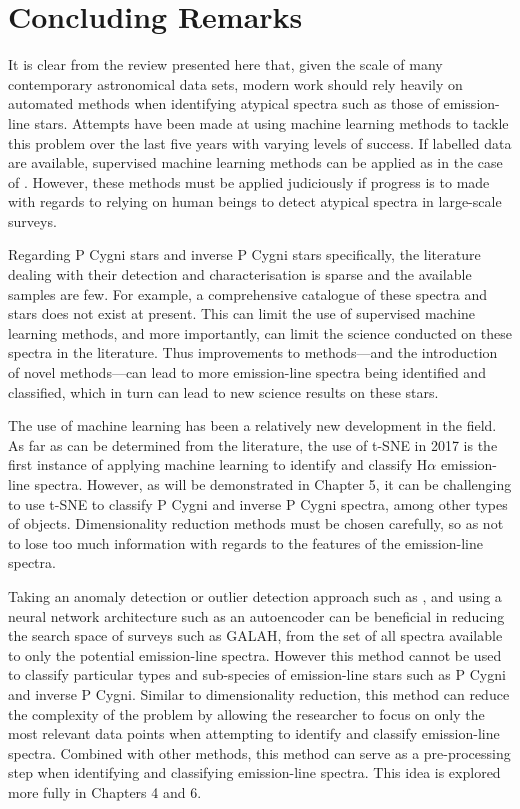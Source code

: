 \section{Concluding Remarks}

It is clear from the review presented here that, given the scale of many contemporary astronomical data sets, modern work should rely heavily on automated methods when identifying atypical spectra such as those of emission-line stars. Attempts have been made at using machine learning methods to tackle this problem over the last five years with varying levels of success. If labelled data are available, supervised machine learning methods can be applied as in the case of \citet{zhang2021catalog}. However, these methods must be applied judiciously if progress is to made with regards to relying on human beings to detect atypical spectra in large-scale surveys.

Regarding P Cygni stars and inverse P Cygni stars specifically, the literature dealing with their detection and characterisation is sparse and the available samples are few. For example, a comprehensive catalogue of these spectra and stars does not exist at present. This can limit the use of supervised machine learning methods, and more importantly, can limit the science conducted on these spectra in the literature. Thus improvements to methods—and the introduction of novel methods—can lead to more emission-line spectra being identified and classified, which in turn can lead to new science results on these stars. 

The use of machine learning has been a relatively new development in the field. As far as can be determined from the literature, the use of t-SNE in 2017 is the first instance of applying machine learning to identify and classify H$\alpha$ emission-line spectra. However, as will be demonstrated in Chapter 5, it can be challenging to use t-SNE to classify P Cygni and inverse P Cygni spectra, among other types of objects. Dimensionality reduction methods must be chosen carefully, so as not to lose too much information with regards to the features of the emission-line spectra.

Taking an anomaly detection or outlier detection approach such as \citet{vcotar2021galah}, and using a neural network architecture such as an autoencoder can be beneficial in reducing the search space of surveys such as GALAH, from the set of all spectra available to only the potential emission-line spectra. However this method cannot be used to classify particular types and sub-species of emission-line stars such as P Cygni and inverse P Cygni. Similar to dimensionality reduction, this method can reduce the complexity of the problem by allowing the researcher to focus on only the most relevant data points when attempting to identify and classify emission-line spectra. Combined with other methods, this method can serve as a pre-processing step when identifying and classifying emission-line spectra. This idea is explored more fully in Chapters 4 and 6. 

